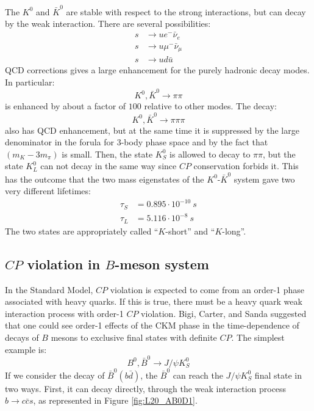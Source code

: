 \documentclass[../../main/main.tex]{subfiles}
\begin{document}
The \( K^0 \) and \( \bar{K}^0 \) are stable with respect to the strong interactions, but can decay by the weak interaction. There are several possibilities:
\begin{align}
	s	&\longrightarrow	u e^- \bar{\nu}_e	\\
	s	&\longrightarrow	u \mu^- \bar{\nu}_{\mu}	\\
	s	&\longrightarrow	u d \bar{u}
\end{align}
QCD corrections gives a large enhancement for the purely hadronic decay modes. In particular:
\begin{equation}
	K^0, \bar{K}^0 \longrightarrow \pi \pi
	\label{eq:}
\end{equation}
is enhanced by about a factor of \( 100 \) relative to other modes. The decay:
\begin{equation}
	K^0, \bar{K}^0 \longrightarrow \pi \pi \pi
	\label{eq:}
\end{equation}
also has QCD enhancement, but at the same time it is suppressed by the large denominator in the forula for 3-body phase space and by the fact that \( (m_K - 3m_{\pi}) \) is small.
Then, the state \( K^0_S \) is allowed to decay to \( \pi \pi \), but the state \( K^0_L \) can not decay in the same way since \( CP \) conservation forbids it. This has the outcome that the two mass eigenstates of the \( K^0 \)-\( \bar{K}^0 \) system gave two very different lifetimes:
\begin{align}
	\tau_S	&=	0.895 \cdot 10^{-10} \ \si{s}	\\
	\tau_L	&=	5.116 \cdot 10^{-8}  \ \si{s}
\end{align}
The two states are appropriately called ``\( K \)-short'' and ``\( K \)-long''.




\subsection{\( CP \) violation in \( B \)-meson system}
In the Standard Model, \( CP \) violation is expected to come from an order-1 phase associated with heavy quarks. If this is true, there must be a heavy quark weak interaction process with order-1 \( CP \) violation. Bigi, Carter, and Sanda suggested that one could see order-1 effects of the CKM phase in the time-dependence of decays of \( B \) mesons to exclusive final states with definite \( CP \). The simplest example is:
\begin{equation}
	B^0, \bar{B}^0
	\longrightarrow
	J/\psi K^0_S
	\label{eq:}
\end{equation}
If we consider the decay of \( \bar{B}^0 (b\bar{d}) \), the \( \bar{B}^0 \) can reach the \( J/\psi K^0_S \) final state in two ways. First, it can decay directly, through the weak interaction process \( b \rightarrow c\bar{c}s \), as represented in Figure \ref{fig:L20_AB0D1}.
\end{document}

